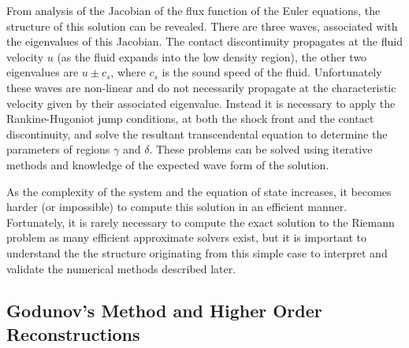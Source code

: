 From analysis of the Jacobian of the flux function of the Euler equations, the structure of this solution can be revealed.
There are three waves, associated with the eigenvalues of this Jacobian.
The contact discontinuity propagates at the fluid velocity $u$ (as the fluid expands into the low density region), the other two eigenvalues are $u\pm c_s$, where $c_s$ is the sound speed of the fluid.
Unfortunately these waves are non-linear and do not necessarily propagate at the characteristic velocity given by their associated eigenvalue.
Instead it is necessary to apply the Rankine-Hugoniot jump conditions, at both the shock front and the contact discontinuity, and solve the resultant transcendental equation to determine the parameters of regions $\gamma$ and $\delta$.
These problems can be solved using iterative methods and knowledge of the expected wave form of the solution.

As the complexity of the system and the equation of state increases, it becomes harder (or impossible) to compute this solution in an efficient manner.
Fortunately, it is rarely necessary to compute the exact solution to the Riemann problem as many efficient approximate solvers exist, but it is important to understand the the structure originating from this simple case to interpret and validate the numerical methods described later.


\subsection{Godunov's Method and Higher Order Reconstructions}

